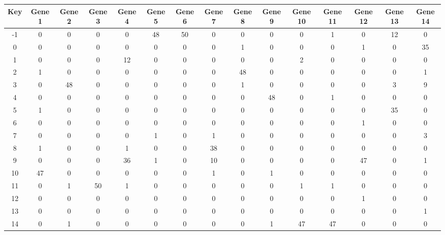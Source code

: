 \begin{tabular}{|c|c|c|c|c|c|c|c|c|c|c|c|c|c|c|}
\hline
Key & Gene 1 & Gene 2 & Gene 3 & Gene 4 & Gene 5 & Gene 6 & Gene 7 & Gene 8 & Gene 9 & Gene 10 & Gene 11 & Gene 12 & Gene 13 & Gene 14 \\
\hline
-1 & 0 & 0 & 0 & 0 & 48 & 50 & 0 & 0 & 0 & 0 & 1 & 0 & 12 & 0 \\
0 & 0 & 0 & 0 & 0 & 0 & 0 & 0 & 1 & 0 & 0 & 0 & 1 & 0 & 35 \\
1 & 0 & 0 & 0 & 12 & 0 & 0 & 0 & 0 & 0 & 2 & 0 & 0 & 0 & 0 \\
2 & 1 & 0 & 0 & 0 & 0 & 0 & 0 & 48 & 0 & 0 & 0 & 0 & 0 & 1 \\
3 & 0 & 48 & 0 & 0 & 0 & 0 & 0 & 1 & 0 & 0 & 0 & 0 & 3 & 9 \\
4 & 0 & 0 & 0 & 0 & 0 & 0 & 0 & 0 & 48 & 0 & 1 & 0 & 0 & 0 \\
5 & 1 & 0 & 0 & 0 & 0 & 0 & 0 & 0 & 0 & 0 & 0 & 0 & 35 & 0 \\
6 & 0 & 0 & 0 & 0 & 0 & 0 & 0 & 0 & 0 & 0 & 0 & 1 & 0 & 0 \\
7 & 0 & 0 & 0 & 0 & 1 & 0 & 1 & 0 & 0 & 0 & 0 & 0 & 0 & 3 \\
8 & 1 & 0 & 0 & 1 & 0 & 0 & 38 & 0 & 0 & 0 & 0 & 0 & 0 & 0 \\
9 & 0 & 0 & 0 & 36 & 1 & 0 & 10 & 0 & 0 & 0 & 0 & 47 & 0 & 1 \\
10 & 47 & 0 & 0 & 0 & 0 & 0 & 1 & 0 & 1 & 0 & 0 & 0 & 0 & 0 \\
11 & 0 & 1 & 50 & 1 & 0 & 0 & 0 & 0 & 0 & 1 & 1 & 0 & 0 & 0 \\
12 & 0 & 0 & 0 & 0 & 0 & 0 & 0 & 0 & 0 & 0 & 0 & 1 & 0 & 0 \\
13 & 0 & 0 & 0 & 0 & 0 & 0 & 0 & 0 & 0 & 0 & 0 & 0 & 0 & 1 \\
14 & 0 & 1 & 0 & 0 & 0 & 0 & 0 & 0 & 1 & 47 & 47 & 0 & 0 & 0 \\
\hline
\end{tabular}